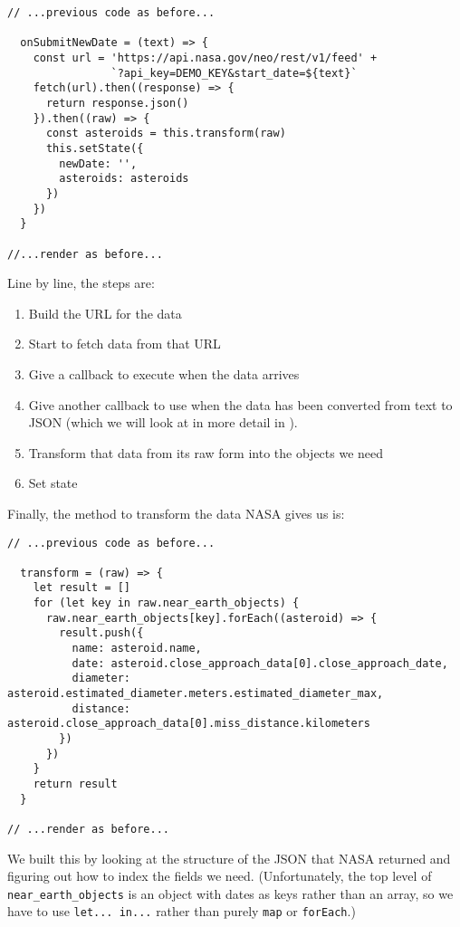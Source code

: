 \begin{verbatim}
// ...previous code as before...

  onSubmitNewDate = (text) => {
    const url = 'https://api.nasa.gov/neo/rest/v1/feed' +
                `?api_key=DEMO_KEY&start_date=${text}`
    fetch(url).then((response) => {
      return response.json()
    }).then((raw) => {
      const asteroids = this.transform(raw)
      this.setState({
        newDate: '',
        asteroids: asteroids
      })
    })
  }

//...render as before...
\end{verbatim}

Line by line,
the steps are:

\begin{enumerate}
\item
  Build the URL for the data
\item
  Start to fetch data from that URL
\item
  Give a callback to execute when the data arrives
\item
  Give another callback to use when the data has been converted from text to JSON
  (which we will look at in more detail in ).
\item
  Transform that data from its raw form into the objects we need
\item
  Set state
\end{enumerate}

Finally,
the method to transform the data NASA gives us is:

\begin{verbatim}
// ...previous code as before...

  transform = (raw) => {
    let result = []
    for (let key in raw.near_earth_objects) {
      raw.near_earth_objects[key].forEach((asteroid) => {
        result.push({
          name: asteroid.name,
          date: asteroid.close_approach_data[0].close_approach_date,
          diameter: asteroid.estimated_diameter.meters.estimated_diameter_max,
          distance: asteroid.close_approach_data[0].miss_distance.kilometers
        })
      })
    }
    return result
  }

// ...render as before...
\end{verbatim}

We built this by looking at the structure of the JSON that NASA returned
and figuring out how to index the fields we need.
(Unfortunately,
the top level of \texttt{near\_earth\_objects} is an object with dates as keys rather than an array,
so we have to use \texttt{let...\ in...} rather than purely \texttt{map} or \texttt{forEach}.)

